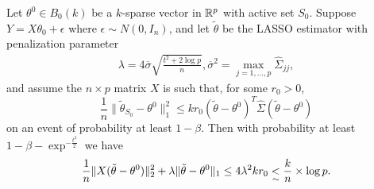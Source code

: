 \begin{thm}
  Let $\theta^{0} \in B_{0}(k)$ be a $k$-sparse vector in $\mathbb{R}^{p}$
  with active set $S_{0}$.  Suppose $Y = X \theta_{0} + \epsilon$
  where $\epsilon \sim N(0, I_{n})$, and let $\tilde \theta$ be the
  LASSO estimator with penalization parameter
  \begin{align}
    \label{eq:31}
    \lambda = 4 \overline \sigma \sqrt{\frac{t^{2} + 2 \log p}{n} },
    \overline \sigma^{2} = \max_{j = 1, \dots, p} \hat \Sigma_{jj},
  \end{align} and assume the $n \times p$ matrix $X$ is such that, for
  some $r_{0} > 0$,
  \begin{equation}
    \label{eq:33}
    \frac{1}{n} \| \tilde \theta_{S_{0}} - \theta^{0} \|_{1}^{2} \leq
    k r_{0}(\tilde \theta - \theta^{0})^{T} \hat \Sigma (\tilde \theta
    - \theta^{0})
  \end{equation} on an event of probability at least $1 - \beta$.
  Then with probability at least $1 - \beta - \exp^{-\frac{t^{2}}{2}}$
  we have
  \begin{align}
    \label{eq:34}
    \frac{1}{n} \| X(\tilde \theta - \theta^{0}) \|_{2}^{2} + \lambda
    \| \tilde \theta - \theta^{0} \|_{1} \leq 4 \lambda^{2} k r_{0}
    \underset{\sim}{<} \frac{k}{n} \times \log p.
  \end{align}
\end{thm}

